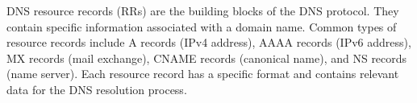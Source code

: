 DNS resource records (RRs) are the building blocks of the DNS protocol. They contain specific information associated with a domain name. Common types of resource records include A records (IPv4 address), AAAA records (IPv6 address), MX records (mail exchange), CNAME records (canonical name), and NS records (name server). Each resource record has a specific format and contains relevant data for the DNS resolution process.




